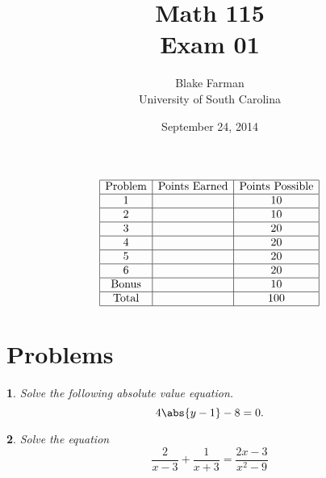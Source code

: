 \documentclass[12pt]{amsart}
\author{Blake Farman\\University of South Carolina}
\title{Math 115\\ Exam 01}
\date{September 24, 2014}
\begin{document}
\maketitle

\begin{center}
\end{center}

\vspace{0.2in}
\vspace{0.2in}

\theoremstyle{plain}
\newtheorem{thm}{}
\newtheorem{lem}{Lemma}
\theoremstyle{definition}
\newtheorem{defn}{Definition}

$$
\begin{array}{|c|c|c|}
  \hline
  \text{Problem} & \text{Points Earned} & \text{Points Possible}\\
  \hline
  1 & & 10\\
  \hline
  2 & & 10\\
  \hline
  3 & & 20\\
  \hline
  4 & & 20\\
  \hline
  5 & & 20\\
  \hline
  6 & & 20\\
  \hline
  \text{Bonus} & & 10\\
  \hline
  \text{Total} & & 100\\
  \hline
\end{array}
$$

\newpage

\section{Problems}

\begin{thm}
  Solve the following absolute value equation.
  $$4\abs{y - 1} - 8 = 0.$$
\end{thm}

\newpage

\begin{thm}
  Solve the equation
  $$\frac{2}{x - 3} + \frac{1}{x +3} = \frac{2x - 3}{x^2 - 9}$$
\end{thm}
\end{document}
